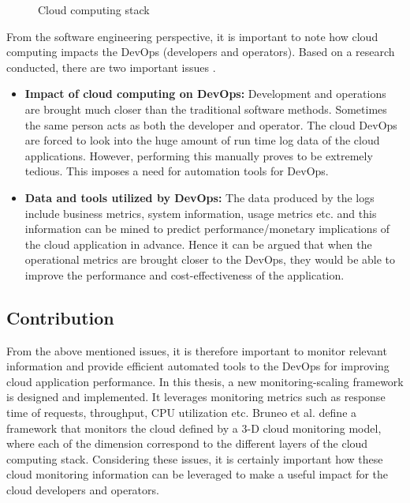 \documentclass[article,type=msc,colorback,12pt,accentcolor=tud8b,table]{tudthesis}
\begin{document}
 \begin{figure}
 \begin{center}
  \makebox[\textwidth]{\texttt{[image: 1-1]}}
\end{center}
\caption{Cloud computing stack}
\label{fig:ccstack}
\end{figure}

%	
%	
%	
	
 From the software engineering perspective, it is important to note how cloud computing impacts the DevOps (developers and operators). Based on a research conducted, there are two important issues \cite{cito2015making}. 

\begin{itemize}
	\item \textbf{Impact of cloud computing on DevOps:}
	Development and operations are brought much closer than the traditional software methods. Sometimes the same person acts as both the developer and operator. The cloud DevOps are forced to look into the huge amount of run time log data of the cloud applications. However, performing this manually proves to be extremely tedious. This imposes a need for automation tools for DevOps.
	
	\item \textbf{Data and tools utilized by DevOps:}
	The data produced by the logs include business metrics, system information, usage metrics etc. and this information can be mined to predict performance/monetary implications of the cloud application in advance. Hence it can be argued that when the operational metrics are brought closer to the DevOps, they would be able to improve the performance and cost-effectiveness of the application.
	
\end{itemize}
 
	\subsection{Contribution}	
	
	From the above mentioned issues, it is therefore important to monitor relevant information and provide efficient automated tools to the DevOps for improving cloud application performance. In this thesis, a new monitoring-scaling framework is designed and implemented. It leverages monitoring metrics such as response time of requests, throughput, CPU utilization etc. Bruneo et al.\cite{bruneo2015framework} define a framework that monitors the cloud defined by a 3-D cloud monitoring model, where each of the dimension correspond to the different layers of the cloud computing stack. Considering these issues, it is certainly important how these cloud monitoring information can be leveraged to make a useful impact for the cloud developers and operators. 
	
\end{document}
